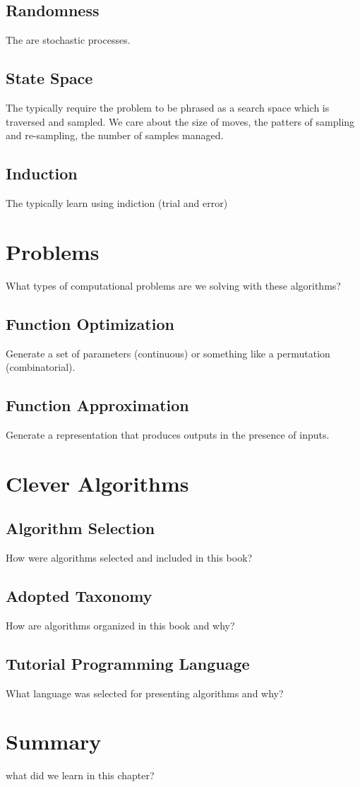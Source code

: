 \subsection{Randomness}
The are stochastic processes.

\subsection{State Space}
The typically require the problem to be phrased as a search space which is traversed and sampled.
We care about the size of moves, the patters of sampling and re-sampling, the number of samples managed.

\subsection{Induction}
The typically learn using indiction (trial and error)



\section{Problems}
What types of computational problems are we solving with these algorithms?

\subsection{Function Optimization}
Generate a set of parameters (continuous) or something like a permutation (combinatorial).

\subsection{Function Approximation}
Generate a representation that produces outputs in the presence of inputs.



\section{Clever Algorithms}

\subsection{Algorithm Selection}
How were algorithms selected and included in this book?

\subsection{Adopted Taxonomy}
How are algorithms organized in this book and why?

\subsection{Tutorial Programming Language}
What language was selected for presenting algorithms and why?

\section{Summary}
what did we learn in this chapter?
